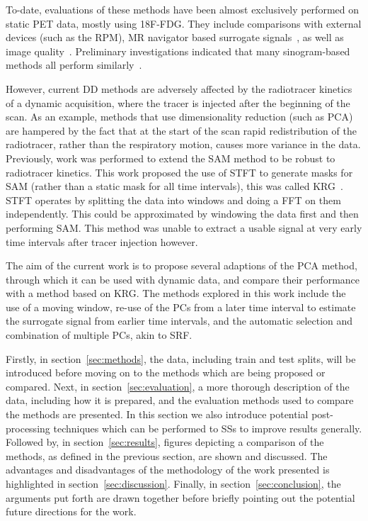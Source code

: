     To-date, evaluations of these methods have been almost exclusively performed on static \gls{PET} data, mostly using \gls{18F-FDG}. They include comparisons with external devices (such as the \gls{RPM}), \gls{MR} navigator based surrogate signals~\parencite{Manber2015PracticalPET/MR}, as well as image quality~\parencite{Buther2020ClinicalMotion, Walker2019EvaluationImaging}. Preliminary investigations indicated that many sinogram-based methods all perform similarly~\parencite{Thielemans2013ComparisonData}.
    
    However, current \gls{DD} methods are adversely affected by the radiotracer kinetics of a dynamic acquisition, where the tracer is injected after the beginning of the scan. As an example, methods that use dimensionality reduction (such as \gls{PCA}) are hampered by the fact that at the start of the scan rapid redistribution of the radiotracer, rather than the respiratory motion, causes more variance in the data. Previously, work was performed to extend the \gls{SAM} method to be robust to radiotracer kinetics. This work proposed the use of \gls{STFT} to generate masks for \gls{SAM} (rather than a static mask for all time intervals), this was called \gls{KRG}~\parencite{Schleyer2014}. \gls{STFT} operates by splitting the data into windows and doing a \gls{FFT} on them independently. This could be approximated by windowing the data first and then performing \gls{SAM}. This method was unable to extract a usable signal at very early time intervals after tracer injection however.
    
    The aim of the current work is to propose several adaptions of the \gls{PCA} method, through which it can be used with dynamic data, and compare their performance with a method based on \gls{KRG}. The methods explored in this work include the use of a moving window, re-use of the \glspl{PC} from a later time interval to estimate the surrogate signal from earlier time intervals, and the automatic selection and combination of multiple \glspl{PC}, akin to \gls{SRF}.

    Firstly, in section~\ref{sec:methods}, the data, including train and test splits, will be introduced before moving on to the methods which are being proposed or compared. Next, in section~\ref{sec:evaluation}, a more thorough description of the data, including how it is prepared, and the evaluation methods used to compare the methods are presented. In this section we also introduce potential post-processing techniques which can be performed to \glspl{SS} to improve results generally. Followed by, in section~\ref{sec:results}, figures depicting a comparison of the methods, as defined in the previous section, are shown and discussed. The advantages and disadvantages of the methodology of the work presented is highlighted in section~\ref{sec:discussion}. Finally, in section~\ref{sec:conclusion}, the arguments put forth are drawn together before briefly pointing out the potential future directions for the work.
    

